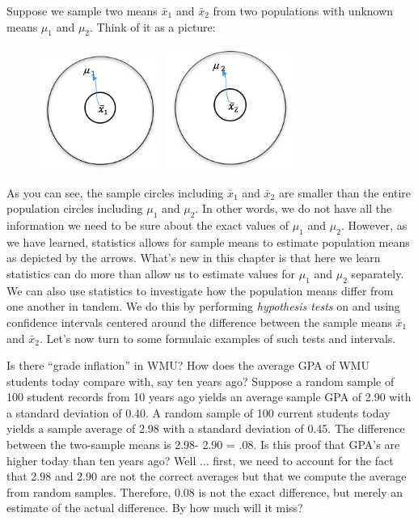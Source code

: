\documentclass[11pt, chapterprefix=true]{scrbook}\usepackage[]{graphicx}\usepackage[]{color}
\begin{document}
Suppose we sample two means $\bar{x}_1$ and $\bar{x}_2$  from two populations with unknown means $\mu_1$ and $\mu_2$. Think of it as a picture:

\begin{figure}[ht]
\centering
\includegraphics[width=4cm]{chapters/Chapter_12/ext_figure/x1.png} %
\includegraphics[width=4.3cm]{chapters/Chapter_12/ext_figure/x2.png} %
\end{figure}

As you can see, the sample circles including $\bar{x}_1$ and $\bar{x}_2$ are smaller than the entire population circles including $\mu_1$ and $\mu_2$. In other words, we do not have all the information we need to be sure about the exact values of  $\mu_1$ and $\mu_2$. However, as we have learned, statistics allows for sample means to estimate population means as depicted by the arrows. What's new in this chapter is that here we learn statistics can do more than allow us to estimate values for $\mu_1$ and $\mu_2$ separately. We can also use statistics to investigate how the population means differ from one another in tandem. We do this by performing \textit{hypothesis tests} on and using confidence intervals centered around the difference between the sample means $\bar{x}_1$ and $\bar{x}_2$. Let's now turn to some formulaic examples of such tests and intervals.

Is there ``grade inflation'' in WMU?  How does the average GPA of WMU students today compare with, say ten years ago?  Suppose a random sample of 100 student records from 10 years ago yields an average sample GPA of 2.90 with a standard deviation of 0.40.  A random sample of 100 current students today yields a sample average of 2.98 with a standard deviation of 0.45.  The difference between the two-sample means is 2.98- 2.90 = .08.  Is this proof that GPA's are higher today than ten years ago?  Well $\dots$ first, we need to account for the fact that 2.98 and 2.90 are not the correct averages but that we compute the average from random samples.  Therefore, 0.08 is not the exact difference, but merely an estimate of the actual difference. By how much will it miss?
\end{document}
